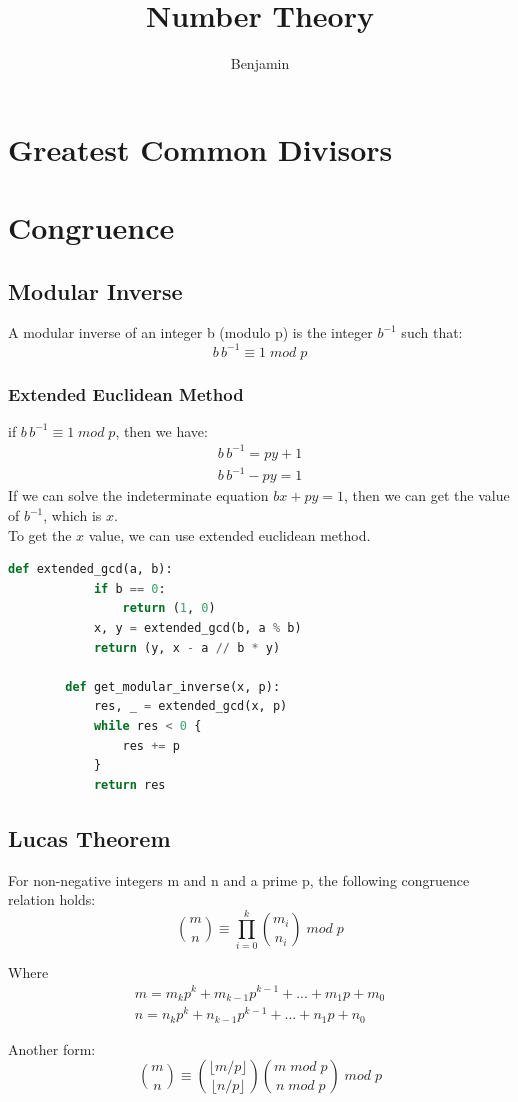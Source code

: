 \documentclass{article}
\title{Number Theory}
\author{Benjamin}
\date{}
\begin{document}
\maketitle

\section{Greatest Common Divisors}

\section{Congruence}
  \subsection{Modular Inverse}
    A modular inverse of an integer b (modulo p) is the integer $ b^{-1} $ such that:
      $$ b \, b^{-1} \equiv 1 \; mod \; p $$
    \subsubsection{Extended Euclidean Method}
      if $ b \, b^{-1} \equiv 1 \; mod \; p $, then we have:
      \begin{align*}
        b \, b^{-1} = py + 1 \\
        b \, b^{-1} - py = 1 
      \end{align*}
      If we can solve the indeterminate equation $ bx + py = 1 $, then we can get the value of $ b^{-1} $, which is $ x $. \\
      To get the $ x $ value, we can use extended euclidean method.
      \begin{lstlisting}[language=Python, basicstyle=\small]
        def extended_gcd(a, b):
            if b == 0:
                return (1, 0)
            x, y = extended_gcd(b, a % b)
            return (y, x - a // b * y)
        
        def get_modular_inverse(x, p):
            res, _ = extended_gcd(x, p)
            while res < 0 {
                res += p
            }
            return res
      \end{lstlisting}
  \subsection{Lucas Theorem}
    For non-negative integers m and n and a prime p, the following congruence relation holds:
    \begin{equation*}
      \binom{m}{n} \equiv \prod_{i = 0}^{k} \binom{m_i}{n_i} \; mod \; p
    \end{equation*}
    
    Where
    \begin{align*}
      m = m_{k}p^{k} + m_{k-1}p^{k-1} + ... + m_{1}p + m_{0} \\
      n = n_{k}p^{k} + n_{k-1}p^{k-1} + ... + n_{1}p + n_{0}
    \end{align*}

    Another form:
    \begin{equation*}
      \binom{m}{n} \equiv \binom{\lfloor m/p \rfloor}{\lfloor n/p \rfloor} \binom{m \; mod \; p}{n \; mod \; p} \; mod \; p
    \end{equation*}
\end{document}
